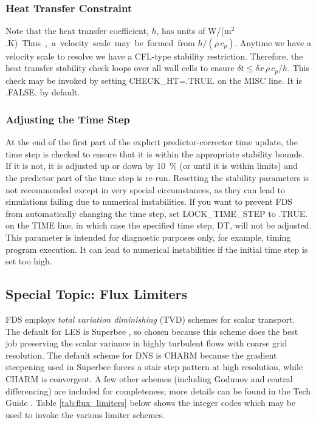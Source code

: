 \documentclass[11pt]{book}
\begin{document}
\subsubsection{Heat Transfer Constraint}

Note that the heat transfer coefficient, $h$, has units of \si{W/(m$^2$.K)}.  Thus, a velocity scale may be formed from $h/(\rho\, c_p)$.
Anytime we have a velocity scale to resolve we have a CFL-type stability restriction.
Therefore, the heat transfer stability check loops over all wall cells to ensure $\delta t \le \delta x \,\rho \,c_p/h$.
This check may be invoked by setting {\ct CHECK\_HT=.TRUE.} on the {\ct MISC} line. It is {\ct .FALSE.} by default.


\subsubsection{Adjusting the Time Step}

At the end of the first part of the explicit predictor-corrector time update, the time step is checked to ensure that it is within the appropriate stability bounds. If it is not, it is adjusted up or down by 10~\% (or until it is within limits) and the predictor part of the time step is re-run. Resetting the stability parameters is not recommended except in very special circumstances, as they can lead to simulations failing due to numerical instabilities. If you want to prevent FDS from automatically changing the time step, set {\ct LOCK\_TIME\_STEP} to {\ct .TRUE.} on the {\ct TIME} line, in which case the specified time step, {\ct DT}, will not be adjusted. This parameter is intended for diagnostic purposes only, for example, timing program execution. It can lead to numerical instabilities if the initial time step is set too high.


\subsection{Special Topic: Flux Limiters}
\label{info:flux_limiters}

FDS employs \emph{total variation diminishing} (TVD) schemes for scalar transport.  The default for LES is Superbee \cite{Roe:1986}, so chosen because this scheme does the best job preserving the scalar variance in highly turbulent flows with coarse grid resolution.  The default scheme for DNS is CHARM \cite{Zhou:1995} because the gradient steepening used in Superbee forces a stair step pattern at high resolution, while CHARM is convergent.   A few other schemes (including Godunov and central differencing) are included for completeness; more details can be found in the Tech Guide \cite{FDS_Tech_Guide}.  Table \ref{tab:flux_limiters} below shows the integer codes which may be used to invoke the various limiter schemes.
\end{document}
